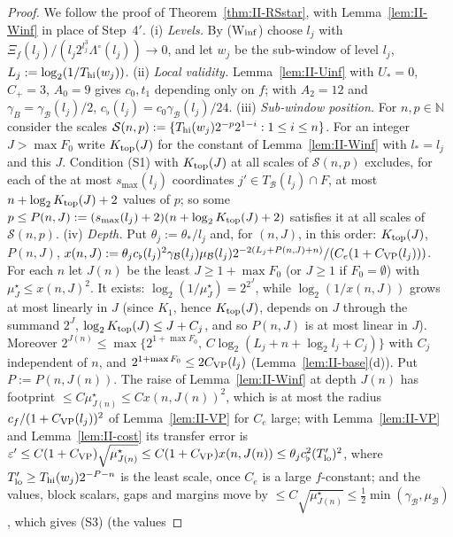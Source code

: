 \documentclass[10pt]{amsart}
\theoremstyle{definition}
\theoremstyle{remark}
\newcommand{\N}{\mathbb N}
\begin{document}
\begin{proof}
We follow the proof of Theorem~\ref{thm:II-RSstar}, with
Lemma~\ref{lem:II-Winf} in place of Step~4$'$.
(i) \emph{Levels.}  By (W$_{\rm inf}$) choose $l_j$ with
$\Xi_f(l_j)/(l_j2^{l_j^3}\Lambda^\circ(l_j))\to0$, and let $w_j$ be the
sub-window of level $l_j$, $L_j:=\log_2(1/T_{\rm hi}(w_j))$.
(ii) \emph{Local validity.}  Lemma~\ref{lem:II-Uinf} with $U_*=0$, $C_+=3$,
$A_0=9$ gives $c_0,t_1$ depending only on $f$; with $A_2=12$ and
$\gamma_B=\gamma_{\mathcal B}(l_j)/2$, $c_\flat(l_j)=c_0\gamma_{\mathcal B}(l_j)/24$.
(iii) \emph{Sub-window position.}  For $n,p\in\N$ consider the scales
$\mathcal S(n,p):=\{T_{\rm hi}(w_j)2^{-p}2^{1-i}:1\le i\le n\}$.  For an integer
$J>\max F_0$ write $K_{\rm top}(J)$ for the constant of
Lemma~\ref{lem:II-Winf} with $l_*=l_j$ and this $J$.  Condition (S1) with
$K_{\rm top}(J)$ at all scales of $\mathcal S(n,p)$ excludes, for each of the
at most $s_{\max}(l_j)$ coordinates $j'\in T_{\mathcal B}(l_j)\cap F$, at most
$n+\log_2K_{\rm top}(J)+2$ values of $p$; so some $p\le P(n,J):=(s_{\max}(l_j)
+2)(n+\log_2K_{\rm top}(J)+2)$ satisfies it at all scales of $\mathcal S(n,p)$.
(iv) \emph{Depth.}  Put $\theta_j:=\theta_*/l_j$ and, for $(n,J)$, in this
order: $K_{\rm top}(J)$, $P(n,J)$, $x(n,J):=\theta_jc_\flat(l_j)^2\gamma_{\mathcal
B}(l_j)\mu_{\mathcal B}(l_j)2^{-2(L_j+P(n,J)+n)}/(C_e(1+C_{\rm VP}(l_j)))$.  For
each $n$ let $J(n)$ be the least $J\ge1+\max F_0$ (or $J\ge1$ if $F_0=\emptyset$)
with $\mu^\star_J\le x(n,J)^2$.  It exists: $\log_2(1/\mu^\star_J)=2^{2^J}$,
while $\log_2(1/x(n,J))$ grows at most linearly in $J$ (since $K_1$, hence
$K_{\rm top}(J)$, depends on $J$ through the summand $2^J$, $\log_2K_{\rm
top}(J)\le J+C_j$, and so $P(n,J)$ is at most linear in $J$).  Moreover
$2^{J(n)}\le\max\{2^{1+\max F_0},\,C\log_2(L_j+n+\log_2 l_j+C_j)\}$ with
$C_j$ independent of $n$, and $2^{1+\max F_0}\le2C_{\rm VP}(l_j)$
(Lemma~\ref{lem:II-base}(d)).  Put $P:=P(n,J(n))$.  The raise of
Lemma~\ref{lem:II-Winf} at depth $J(n)$ has footprint $\le C\mu^\star_{J(n)}\le
Cx(n,J(n))^2$, which is at most the radius $c_f/(1+C_{\rm VP}(l_j))^2$ of
Lemma~\ref{lem:II-VP} for $C_e$ large; with Lemma~\ref{lem:II-VP} and
Lemma~\ref{lem:II-cost} its transfer error is
$\varepsilon'\le C(1+C_{\rm VP})\sqrt{\mu^\star_{J(n)}}\le C(1+C_{\rm VP})x(n,J(n))
\le\theta_jc_\flat^2(T_{\rm lo}')^2$, where $T'_{\rm lo}\ge T_{\rm hi}(w_j)
2^{-P-n}$ is the least scale, once $C_e$ is a large $f$-constant; and the
values, block scalars, gaps and margins move by $\le C\sqrt{\mu^\star_{J(n)}}\le
\frac12\min(\gamma_{\mathcal B},\mu_{\mathcal B})$, which gives (S3) (the values

\end{proof}
\end{document}
